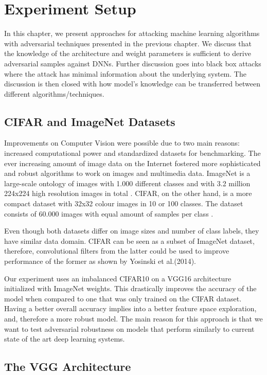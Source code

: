 \chapter{Experiment Setup}

In this chapter, we present approaches for attacking machine learning algorithms with adversarial techniques presented in the previous chapter. We discuss that the knowledge of the architecture and weight parameters is sufficient to derive adversarial samples against DNNs. Further discussion goes into black box attacks where the attack has minimal information about the underlying system. The discussion is then closed with how model's knowledge can be transferred between different algorithms/techniques.
\section{CIFAR and ImageNet Datasets}

Improvements on Computer Vision were possible due to two main reasons: increased computational power and standardized datasets for benchmarking. The ever increasing amount of image data on the Internet fostered more sophisticated and robust algorithms to work on images and multimedia data. ImageNet is a large-scale ontology of images with 1.000 different classes and with 3.2 million 224x224 high resolution images in total \cite{deng2009imagenet}. CIFAR, on the other hand, is a more compact dataset with 32x32 colour images in 10 or 100 classes. The dataset consists of 60.000 images with equal amount of samples per class \cite{krizhevsky_2009}.

Even though both datasets differ on image sizes and number of class labels, they have similar data domain. CIFAR can be seen as a subset of ImageNet dataset, therefore, convolutional filters from the latter could be used to improve performance of the former as shown by Yosinski et al.(2014). 

Our experiment uses an imbalanced CIFAR10 on a VGG16 architecture initialized with ImageNet weights. This drastically improves the accuracy of the model when compared to one that was only trained on the CIFAR dataset. Having a better overall accuracy implies into a better feature space exploration, and, therefore a more robust model. The main reason for this approach is that we want to test adversarial robustness on models that perform similarly to current state of the art deep learning systems.

\section{The VGG Architecture}

